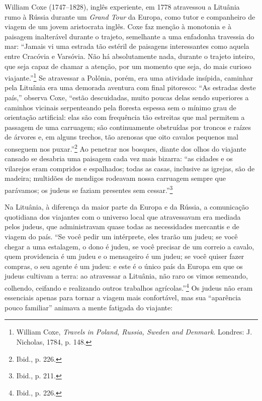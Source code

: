 William Coxe (1747--1828), inglês experiente, em 1778 atravessou a
Lituânia rumo à Rússia durante um \textit{Grand Tour} da Europa, como
tutor e companheiro de viagem de um jovem aristocrata inglês. Coxe faz
menção à monotonia e à paisagem inalterável durante o trajeto,
semelhante a uma enfadonha travessia do mar: ``Jamais vi uma estrada tão
estéril de paisagens interessantes como aquela entre Cracóvia e
Varsóvia. Não há absolutamente nada, durante o trajeto inteiro, que seja
capaz de chamar a atenção, por um momento que seja, do mais curioso
viajante.''\footnote{William Coxe, \textit{Travels in Poland, Russia, Sweden and Denmark}. Londres: J. Nicholas, 1784, p. 148.} Se atravessar a Polônia, porém, era uma atividade insípida, caminhar pela Lituânia era
uma demorada aventura com final pitoresco: ``As estradas deste país,''
observa Coxe, ``estão descuidadas, muito poucas delas sendo superiores a
caminhos vicinais serpenteando pela floresta espessa sem o mínimo grau
de orientação artificial: elas são com frequência tão estreitas que mal
permitem a passagem de uma carruagem; são continuamente obstruídas por
troncos e raízes de árvores e, em alguns trechos, tão arenosas que oito
cavalos pequenos mal conseguem nos puxar.''\footnote{Ibid., p. 226.} Ao
penetrar nos bosques, diante dos olhos do viajante cansado se desabria
uma paisagem cada vez mais bizarra: ``as cidades e os vilarejos eram
compridos e espalhados; todas as casas, inclusive as igrejas, são de
madeira; multidões de mendigos rodeavam nossa carruagem sempre que
parávamos; os judeus se faziam presentes sem cessar.''\footnote{Ibid., p. 211.}
%

Na Lituânia, à diferença da maior parte da Europa e da Rússia, a
comunicação quotidiana dos viajantes com o universo local que
atravessavam era mediada pelos judeus, que administravam quase todas as
necessidades mercantis e de viagem do país. ``Se você pedir um
intérprete, eles trarão um judeu; se você chegar a uma estalagem, o dono
é judeu, se você precisar de um correio a cavalo, quem providencia é um
judeu e o mensageiro é um judeu; se você quiser fazer compras, o seu
agente é um judeu: e este é o único país da Europa em que os judeus
cultivam a terra: ao atravessar a Lituânia, não raro os vimos semeando,
colhendo, ceifando e realizando outros trabalhos agrícolas.''\footnote{Ibid., p. 226.} Os judeus não eram essenciais apenas para tornar a viagem mais confortável, mas sua ``aparência pouco familiar'' animava a mente
fatigada do viajante:

